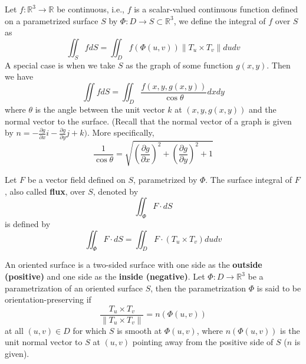 \documentclass[openany]{book}
\newcommand{\R}{\mathbb{R}}
\begin{document}
\begin{defn}
    Let $f:\R^3\to\R$ be continuous, i.e., $f$ is a scalar-valued continuous function defined on a parametrized surface $S$ by $\Phi:D\to S\subset\R^3$, we define the integral of $f$ over $S$ as 
    \begin{equation*}
        \iint_SfdS=\iint_Df(\Phi(u,v))\|T_u\times T_v\|dudv
    \end{equation*}
    A special case is when we take $S$ as the graph of some function $g(x,y)$. Then we have 
    \begin{equation*}
        \iint fdS=\iint_D\frac{f(x,y,g(x,y))}{\cos\theta}dxdy
    \end{equation*}
    where $\theta$ is the angle between the unit vector $k$ at $(x,y,g(x,y))$ and the normal vector to the surface. (Recall that the normal vector of a graph is given by $n=-\frac{\partial g}{\partial x}i-\frac{\partial g}{\partial y}j+k)$. More specifically, 
    \begin{equation*}
        \frac{1}{\cos\theta}=\sqrt{\left(\frac{\partial g}{\partial x}\right)^2+\left(\frac{\partial g}{\partial y}\right)^2+1}
    \end{equation*}
\end{defn}


\begin{defn}[flux]
    Let $F$ be a vector field defined on $S$, parametrized by $\Phi$. The surface integral of $F$, also called \textbf{flux}, over $S$, denoted by 
    \begin{equation*}
        \iint_\Phi F\cdot dS
    \end{equation*}
    is defined by 
    \begin{equation*}
        \iint_\Phi F\cdot dS=\iint_DF\cdot(T_u\times T_v)dudv
    \end{equation*}
\end{defn}



\begin{defn}
    An oriented surface is a two-sided surface with one side as the \textbf{outside (positive)} and one side as the \textbf{inside (negative)}. Let $\Phi:D\to\R^3$ be a parametrization of an oriented surface $S$, then the parametrization $\Phi$ is said to be orientation-preserving if 
    \begin{equation*}
        \frac{T_u\times T_v}{\|T_u\times T_v\|}=n(\Phi(u,v)) 
    \end{equation*} 
    at all $(u,v)\in D$ for which $S$ is smooth at $\Phi(u,v)$, where $n(\Phi(u,v))$ is the unit normal vector to $S$ at $(u,v)$ pointing away from the positive side of $S$ ($n$ is given).
\end{defn}
\end{document}
